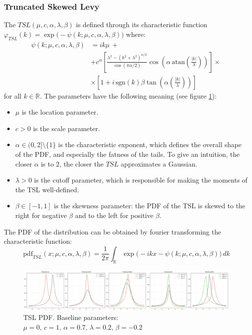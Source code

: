 \documentclass[12pt]{article}
\newcommand{\atan}{\,\text{atan}}
\newcommand{\sgn}{\,\text{sgn}}
\newcommand{\pdf}{\,\text{pdf}}
\begin{document}
    \subsubsection{Truncated Skewed Levy}
    The $TSL(\mu, c, \alpha, \lambda, \beta)$ is defined through its characteristic function $\varphi_{TSL}(k) = \exp\big(-\psi(k; \mu, c, \alpha, \lambda, \beta)\big)$ where:
    \begin{equation}
        \begin{aligned}
            \psi(k; \mu, c, \alpha, \lambda, \beta) &= ik\mu \,+\\
                                                & + c^{\alpha}\left[\frac{\lambda^2-(k^2+\lambda^2)^{\alpha/2}}{\cos(\pi \alpha/2)}\cos\left(\alpha \atan \left(\frac{|k|}{\lambda}\right)\right)\right] \times \\
                                                & \times \left[ 1+ i \sgn(k) \beta \tan \left(\alpha\left(\frac{|k|}{\lambda}\right)\right) \right]
        \end{aligned}
    \end{equation}
    for all $k \in \mathbb{R}$.
    The parameters have the following meaning (see figure \ref{fig:parameters}):
    \begin{itemize}
        \item $\mu$ is the location parameter.
        \item $c >0$ is the scale parameter.
        \item $\alpha \in (0,2] \setminus\{1\} $ is the characteristic exponent, which defines the overall shape of the PDF, and especially the fatness of the tails. To give an intuition, the closer $\alpha$ is to $2$, the closer the $TSL$ approximates a Gaussian.
        \item $\lambda > 0$ is the cutoff parameter, which is responsible for making the moments of the TSL well-defined.
        \item $\beta \in [-1, 1]$ is the skewness parameter: the PDF of the TSL is skewed to the right for negative $\beta$ and to the left for positive $\beta$.
    \end{itemize}
    The PDF of the distribution can be obtained by fourier transforming the characteristic function:
    \begin{equation}
        \pdf_{TSL}(x; \mu, c, \alpha, \lambda, \beta) =  \frac{1}{2\pi}\int_{\mathbb R} \exp\big(-ikx-\psi(k; \mu, c, \alpha, \lambda, \beta)\big)\,dk\label{eq:pdf}
    \end{equation}
    \begin{figure}[h!]
        \label{fig:parameters}
        \centering
        \includegraphics[width=0.9 \linewidth]{parameters}
        \caption{TSL PDF. Baseline parameters: $\mu=0, \,c=1,\, \alpha = 0.7, \, \lambda = 0.2,\, \beta =-0.2$}
    \end{figure}
\end{document}
